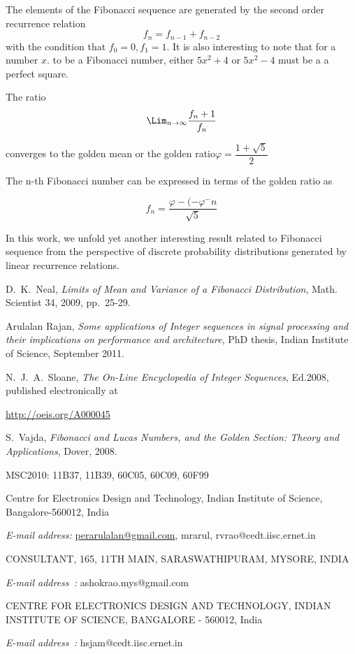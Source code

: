 \begin{multicols}{2}
The elements of the Fibonacci sequence are generated by the second order recurrence relation
$$
f_{n}=f_{n-1}+f_{n-2}
$$
with the condition that $f_{0} = 0, f_{1} = 1$. It is also interesting to note that for a number $x$. to be a Fibonacci number, either $5x^{2} + 4$ or $5x^{2}-4$ must be a a perfect square.

The ratio
$$
{\rm \Lim_{{\it n} \rightarrow \infty}} \dfrac{f_{n}+1}{f_{n}}
$$

converges to the golden mean or the golden ratio\break $\varphi =\dfrac{1+\sqrt{5}}{2}$

The n-th Fibonacci number can be expressed in terms of the golden ratio as

\vspace{-.3cm}

$$
f_{n}= \dfrac{\varphi-(-\varphi^{-}n}{\sqrt{5}}
$$

\vspace{-.3cm}

In this work, we unfold yet another interesting result related to Fibonacci sequence from the perspective of discrete probability distributions generated by linear recurrence relations.


\begin{thebibliography}{99} 
 D.~K.~Neal, \textit{Limits of Mean and Variance of a {F}ibonacci Distribution}, Math. Scientist 34, 2009, pp.~25-29.

 Arulalan Rajan, \textit{Some applications of Integer sequences in signal processing and their implications on performance and architecture}, PhD thesis, Indian Institute of Science, September 2011.

 N.~J.~A.~Sloane, \textit{The On-Line Encyclopedia of Integer Sequences}, Ed.2008, published electronically at 

\url{http://oeis.org/A000045}

 S.~Vajda, \textit{{F}ibonacci and {L}ucas Numbers, and the Golden Section: Theory and Applications}, Dover, 2008.

MSC2010: 11B37, 11B39, 60C05, 60C09, 60F99

Centre for Electronics Design and Technology, Indian Institute of Science, Bangalore-560012, India

{\it E-mail address:} \url{perarulalan@gmail.com}, {mrarul, rvrao}@cedt.iisc.ernet.in

CONSULTANT, 165, 11TH MAIN, SARASWATHIPURAM, MYSORE, INDIA

{\it E-mail address~:} ashokrao.mys@gmail.com

CENTRE FOR ELECTRONICS DESIGN AND TECHNOLOGY, INDIAN INSTITUTE OF SCIENCE, BANGALORE - 560012, India

{\it E-mail address~:} hsjam@cedt.iisc.ernet.in


\end{thebibliography}

\end{multicols}

